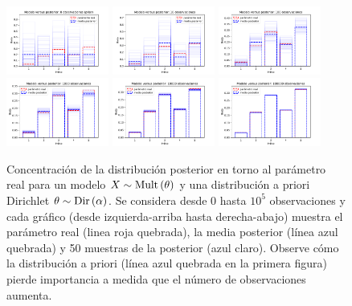 \begin{example}
\begin{figure}[H]
\centering
\includegraphics[width=0.3\textwidth]{img/post_dirichlet_0.pdf}
\includegraphics[width=0.3\textwidth]{img/post_dirichlet_10.pdf}
\includegraphics[width=0.3\textwidth]{img/post_dirichlet_100.pdf}\\
\includegraphics[width=0.3\textwidth]{img/post_dirichlet_1000.pdf}
\includegraphics[width=0.3\textwidth]{img/post_dirichlet_10000.pdf}
\includegraphics[width=0.3\textwidth]{img/post_dirichlet_100000.pdf}
\caption{Concentración de la distribución posterior en torno al parámetro real para un modelo $X\sim\text{Mult}\left(\theta\right)$ y una distribución a priori Dirichlet $\theta\sim\text{Dir}\left(\alpha\right)$. Se considera desde 0 hasta $10^5$ observaciones y cada gráfico (desde izquierda-arriba hasta derecha-abajo) muestra el parámetro real (linea roja quebrada), la media posterior (línea azul quebrada) y 50 muestras de la posterior (azul claro). Observe cómo la distribución a priori (línea azul quebrada en la primera figura) pierde importancia a medida que el número de observaciones aumenta.}
\label{fig:post_Dirichlet}
\end{figure}
\end{example}



